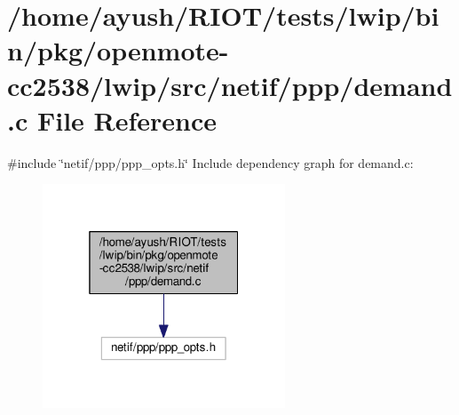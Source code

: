 \hypertarget{openmote-cc2538_2lwip_2src_2netif_2ppp_2demand_8c}{}\section{/home/ayush/\+R\+I\+O\+T/tests/lwip/bin/pkg/openmote-\/cc2538/lwip/src/netif/ppp/demand.c File Reference}
\label{openmote-cc2538_2lwip_2src_2netif_2ppp_2demand_8c}
{\ttfamily \#include \char`\"{}netif/ppp/ppp\+\_\+opts.\+h\char`\"{}}\newline
Include dependency graph for demand.\+c\+:
\nopagebreak
\begin{figure}[H]
\begin{center}
\leavevmode
\includegraphics[width=205pt]{openmote-cc2538_2lwip_2src_2netif_2ppp_2demand_8c__incl}
\end{center}
\end{figure}
